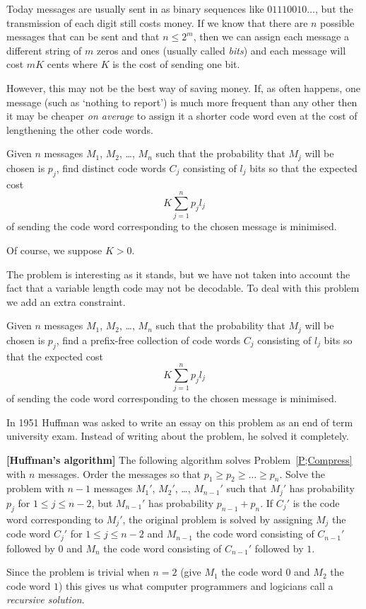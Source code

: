 Today messages are usually sent in
as binary sequences like $01110010\dots$,
but the transmission of each digit still costs
money. If we know that there are $n$ possible
messages that can be sent and that $n\leq 2^{m}$,
then we can assign each message a different
string of $m$ zeros and ones (usually called \emph{bits})
and each message will cost $mK$ cents where $K$
is the cost of sending one bit.

However, this may not be the best way of saving money.
If, as  often happens, one message 
(such as `nothing to report') is much more frequent
than any other then it may be cheaper \emph{on average}
to assign it a shorter code word even at the cost
of lengthening the other code words.
\begin{problem}\label{P;Compress one}
Given $n$ messages $M_{1}$, $M_{2}$,
\dots, $M_{n}$ such that the probability that $M_{j}$
will be chosen is $p_{j}$, find distinct code words $C_{j}$
consisting of $l_{j}$ bits so that the expected cost
\[K\sum_{j=1}^{n}p_{j}l_{j}\]
of sending the code word corresponding to the chosen
message is minimised.
\end{problem}
Of course, we suppose $K>0$.

The problem is interesting as it stands, but we
have not taken into account the fact that a variable
length code may not be decodable. To deal with this
problem we add an extra constraint.
\begin{problem}\label{P;Compress}
Given $n$ messages $M_{1}$, $M_{2}$,
\dots, $M_{n}$ such that the probability that $M_{j}$
will be chosen is $p_{j}$, find a prefix-free
collection of code words $C_{j}$
consisting of $l_{j}$ bits so that the expected cost
\[K\sum_{j=1}^{n}p_{j}l_{j}\]
of sending the code word corresponding to the chosen
message is minimised.
\end{problem}


In 1951 Huffman was asked to write an essay on this problem
as an end of term university exam. Instead of writing about the problem,
he solved it completely.
\begin{theorem}\label{T;Huffman}{\bf [Huffman's algorithm]} 
The following algorithm
solves Problem~\ref{P;Compress} with $n$ messages.
Order the messages so that $p_{1}\geq p_{2}\geq \dots\geq p_{n}$.
Solve the problem with $n-1$ messages $M_{1}'$, $M_{2}'$,
\dots, $M_{n-1}'$ such that $M_{j}'$ has probability $p_{j}$
for $1\leq j\leq n-2$, but $M_{n-1}'$ has probability
$p_{n-1}+p_{n}$. If $C_{j}'$ is the code word corresponding
to $M_{j}'$, the original problem is solved by assigning $M_{j}$
the code word $C_{j}'$ for $1\leq j\leq n-2$ and
$M_{n-1}$ the code word consisting of $C_{n-1}'$ followed
by $0$ and $M_{n}$ the code word consisting of $C_{n-1}'$ 
followed by $1$.
\end{theorem}
Since the problem is trivial when $n=2$ (give $M_{1}$ the code word $0$
and $M_{2}$ the code word $1$) this gives us what computer programmers
and logicians call a \emph{recursive solution}.

